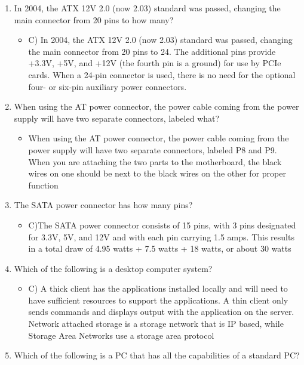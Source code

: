 \documentclass{article}
\begin{document}
\begin{enumerate}
\begin{itemize}
    \end{itemize}
    \item In 2004, the ATX 12V 2.0 (now 2.03) standard was passed, changing the main connector
from 20 pins to how many?
    \begin{itemize}
        \item C) In 2004, the ATX 12V 2.0 (now 2.03) standard was passed, changing the main connector from 20 pins to 24. The additional pins provide +3.3V, +5V, and +12V (the fourth pin is a ground) for use by PCIe cards. When a 24-pin connector is used, there is no need for the optional four- or six-pin auxiliary power connectors.
    \end{itemize}
    \item When using the AT power connector, the power cable coming from the power supply will
have two separate connectors, labeled what?
    \begin{itemize}
        \item When using the AT power connector, the power cable coming from the power supply will have two separate connectors, labeled P8 and P9. When you are attaching the two parts to the motherboard, the black wires on one should be next to the black wires on the other for proper function
    \end{itemize}
      \item The SATA power connector has how many pins?
    \begin{itemize}
        \item C)The SATA power connector consists of 15 pins, with 3 pins designated for 3.3V, 5V, and 12V and with each pin carrying 1.5 amps. This results in a total draw of 4.95 watts + 7.5 watts + 18 watts, or about 30 watts
    \end{itemize}
      \item Which of the following is a desktop computer system?
    \begin{itemize}
        \item C) A thick client has the applications installed locally and will need to have sufficient resources to support the applications. A thin client only sends commands and displays output with the application on the server. Network attached storage is a storage network that is IP based, while Storage Area Networks use a storage area protocol
    \end{itemize}
     \item Which of the following is a PC that has all the capabilities of a standard PC?
    \begin{itemize}

\end{itemize}
\end{enumerate}
\end{document}
